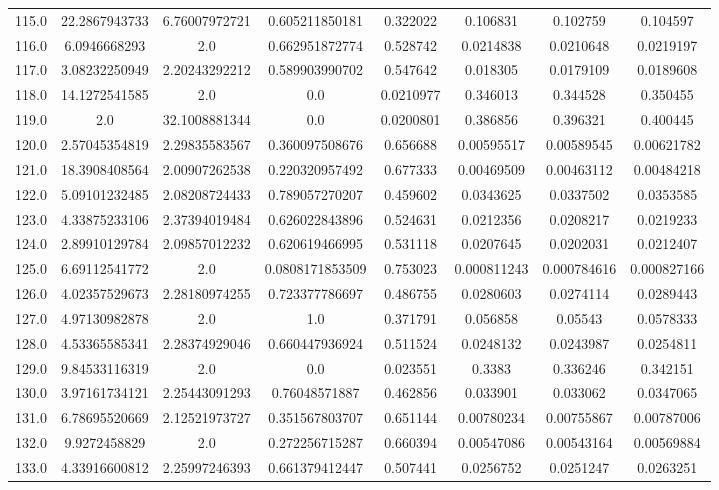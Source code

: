 \begin{longtable}{|c|c|c|c|c|c|c|c|}
115.0 & 22.2867943733 & 6.76007972721 & 0.605211850181 & 0.322022 & 0.106831 & 0.102759 & 0.104597 \\
116.0 & 6.0946668293 & 2.0 & 0.662951872774 & 0.528742 & 0.0214838 & 0.0210648 & 0.0219197 \\
117.0 & 3.08232250949 & 2.20243292212 & 0.589903990702 & 0.547642 & 0.018305 & 0.0179109 & 0.0189608 \\
118.0 & 14.1272541585 & 2.0 & 0.0 & 0.0210977 & 0.346013 & 0.344528 & 0.350455 \\
119.0 & 2.0 & 32.1008881344 & 0.0 & 0.0200801 & 0.386856 & 0.396321 & 0.400445 \\
120.0 & 2.57045354819 & 2.29835583567 & 0.360097508676 & 0.656688 & 0.00595517 & 0.00589545 & 0.00621782 \\
121.0 & 18.3908408564 & 2.00907262538 & 0.220320957492 & 0.677333 & 0.00469509 & 0.00463112 & 0.00484218 \\
122.0 & 5.09101232485 & 2.08208724433 & 0.789057270207 & 0.459602 & 0.0343625 & 0.0337502 & 0.0353585 \\
123.0 & 4.33875233106 & 2.37394019484 & 0.626022843896 & 0.524631 & 0.0212356 & 0.0208217 & 0.0219233 \\
124.0 & 2.89910129784 & 2.09857012232 & 0.620619466995 & 0.531118 & 0.0207645 & 0.0202031 & 0.0212407 \\
125.0 & 6.69112541772 & 2.0 & 0.0808171853509 & 0.753023 & 0.000811243 & 0.000784616 & 0.000827166 \\
126.0 & 4.02357529673 & 2.28180974255 & 0.723377786697 & 0.486755 & 0.0280603 & 0.0274114 & 0.0289443 \\
127.0 & 4.97130982878 & 2.0 & 1.0 & 0.371791 & 0.056858 & 0.05543 & 0.0578333 \\
128.0 & 4.53365585341 & 2.28374929046 & 0.660447936924 & 0.511524 & 0.0248132 & 0.0243987 & 0.0254811 \\
129.0 & 9.84533116319 & 2.0 & 0.0 & 0.023551 & 0.3383 & 0.336246 & 0.342151 \\
130.0 & 3.97161734121 & 2.25443091293 & 0.76048571887 & 0.462856 & 0.033901 & 0.033062 & 0.0347065 \\
131.0 & 6.78695520669 & 2.12521973727 & 0.351567803707 & 0.651144 & 0.00780234 & 0.00755867 & 0.00787006 \\
132.0 & 9.9272458829 & 2.0 & 0.272256715287 & 0.660394 & 0.00547086 & 0.00543164 & 0.00569884 \\
133.0 & 4.33916600812 & 2.25997246393 & 0.661379412447 & 0.507441 & 0.0256752 & 0.0251247 & 0.0263251 \\

\end{longtable}

